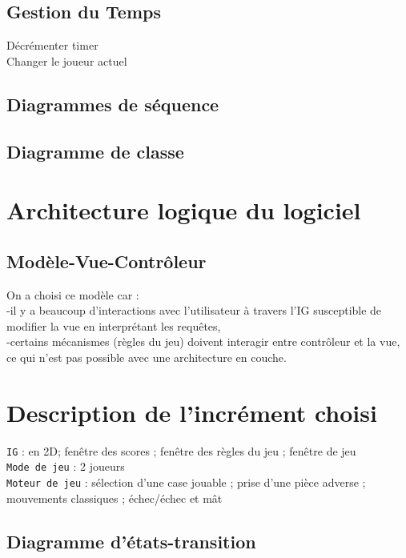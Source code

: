 \documentclass[12pt,a4paper]{report}
\begin{document}
\section*{Gestion du Temps}
Décrémenter timer
\\Changer le joueur actuel
\newpage
\section*{Diagrammes de séquence}

\newpage
\section*{Diagramme de classe}

\maketitle
\chapter*{Architecture logique du logiciel}
\section*{Modèle-Vue-Contrôleur}
On a choisi ce modèle car :
\\-il y a beaucoup d'interactions avec l’utilisateur à travers l’IG susceptible de modifier la vue en interprétant les requêtes,
\\-certains mécanismes (règles du jeu) doivent interagir entre contrôleur et la vue, ce qui n’est pas possible avec une architecture en couche.

\maketitle
\chapter*{Description de l'incrément choisi}
{\tt IG} : en 2D; fenêtre des scores ; fenêtre des règles du jeu ; fenêtre de jeu
\\{\tt Mode de jeu} : 2 joueurs
\\{\tt Moteur de jeu} : sélection d'une case jouable ; prise d'une pièce adverse ; mouvements classiques ; échec/échec et mât 
\newpage
\section*{Diagramme d'états-transition}

\newpage
\end{document}
